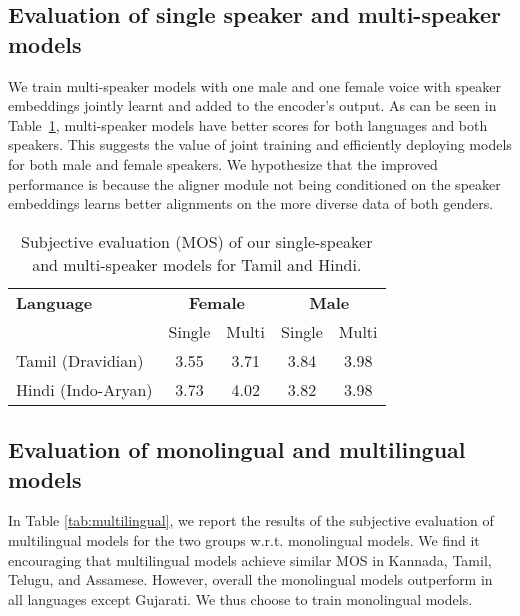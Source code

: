 \documentclass{article}
\begin{document}
\subsection{Evaluation of single speaker and multi-speaker models}
\label{subsec:speaker}
We train multi-speaker models with one male and one female voice with speaker embeddings jointly learnt and added to the encoder's output.
As can be seen in Table~\ref{tab:speaker}, multi-speaker models have better scores for both languages and both speakers.
This suggests the value of joint training and efficiently deploying models for both male and female speakers.
We hypothesize that the improved performance is because the aligner module not being conditioned on the speaker embeddings learns better alignments on the more diverse data of both genders. 


\begin{table}[!htbp]
\centering
\begingroup
\setlength{\tabcolsep}{6pt} \renewcommand{\arraystretch}{0.9} \begin{tabular}{@{}lcccc@{}}
\toprule
\textbf{Language}  & \multicolumn{2}{c}{\textbf{Female}} & \multicolumn{2}{c}{\textbf{Male}} \\ 
 \cmidrule(l){2-3} \cmidrule(l){4-5}
                   & Single    & Multi   & Single   & Multi  \\ \midrule
Tamil (Dravidian)  & 3.55              & 3.71            & 3.84             & 3.98           \\ 
Hindi (Indo-Aryan) & 3.73              & 4.02            & 3.82             & 3.98           \\
\bottomrule
\end{tabular}
\endgroup
\caption{Subjective evaluation (MOS) of our single-speaker and multi-speaker models for Tamil and Hindi.}
\label{tab:speaker}
\end{table}



\subsection{Evaluation of monolingual and multilingual models}
\label{subsec:multilingual}
In Table \ref{tab:multilingual}, we report the results of the subjective evaluation of multilingual models for the two groups w.r.t. monolingual models. We find it encouraging that multilingual models achieve similar MOS in Kannada, Tamil, Telugu, and Assamese.
However, overall the monolingual models outperform in all languages except Gujarati.
We thus choose to train monolingual models.
\end{document}
